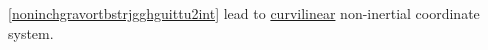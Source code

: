 \documentclass{article}
\theoremstyle{definition}
\theoremstyle{remark}
\newcommand{\er}{\eqref}
\newcommand{\er}{\eqref}
\begin{document}
\er{noninchgravortbstrjgghguittu2int} lead to
\underline{curvilinear} non-inertial coordinate system.
\end{document}
